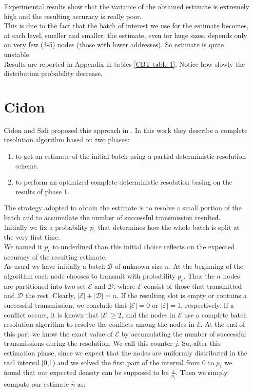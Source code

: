 \documentclass[12pt,a4paper,twocolumns]{report}
\newcommand{\pc}{p_{\epsilon}}
\begin{document}
Experimental results show that the variance of the obtained estimate is extremely high and the resulting accuracy is really poor.\\ 
This is due to the fact that the batch of interest we use for the estimate becomes, at each level, smaller and smaller: the estimate, even for huge sizes, depends only on very few (3-5) nodes (those with lower addresses). So estimate is quite unstable.\\
Results are reported in Appendix in tables  \ref{CBT-table-1}. Notice how slowly the distribution probability decrease.
\section{Cidon}

Cidon and Sidi proposed this approach in \cite{cidon}. In this work they describe a complete resolution algorithm based on two phases:
 
\begin{enumerate}
\item to get an estimate of the initial batch using a partial deterministic resolution scheme. 
\item to perform an optimized complete deterministic resolution basing on the results of phase 1. 
\end{enumerate}

The strategy adopted to obtain the estimate is to resolve a small portion of the batch and to accumulate the number of successful transmission resulted.\\

Initially we fix a probability $\pc$ that determines how the whole batch is split at the very first time.\\
We named it $\pc$ to underlined than this initial choice reflects on the expected accuracy of the resulting estimate.\\

As usual we have initially a batch $\mathcal{B}$ of unknown size $n$.
At the beginning of the algorithm each node chooses to transmit with probability $\pc$. Thus the $n$ nodes are partitioned into two set $\mathcal{E}$ and $\mathcal{D}$, where $\mathcal{E}$ consist of those that transmitted and $\mathcal{D}$ the rest. Clearly, $|\mathcal{E}|+|\mathcal{D}|=n$. If the resulting slot is empty or contains a successful transmission, we conclude that $|\mathcal{E}|=0$  or $|\mathcal{E}|=1$, respectively. If a conflict occurs, it is known that $|\mathcal{E}|\geq2$, and the nodes in $\mathcal{E}$ use a complete batch resolution algorithm to resolve the conflicts among the nodes in $\mathcal{E}$. At the end of this part we know the exact value of $\mathcal{E}$ by accumulating the number of successful transmissions during the resolution. We call this counter $j$.
So, after this estimation phase, since we expect that the nodes are uniformly distributed in the real interval [0,1) and we solved the first part of the interval from 0 to $\pc$ we found that our expected density can be supposed to be $\frac{j}{\pc}$.
Then we simply compute our estimate $\hat{n}$ as: 
\end{document}

